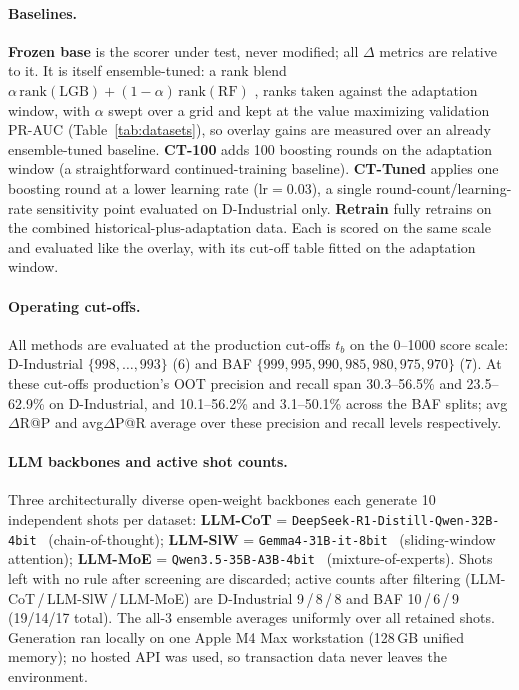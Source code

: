 \documentclass[11pt]{article}
\begin{document}
\paragraph{Baselines.}
\textbf{Frozen base} is the scorer under test, never modified; all $\Delta$ metrics are relative to
it. It is itself ensemble-tuned: a rank blend
$\alpha\,\mathrm{rank}(\mathrm{LGB})+(1{-}\alpha)\,\mathrm{rank}(\mathrm{RF})$
\citep{ke2017lightgbm}, ranks taken against the adaptation window, with $\alpha$ swept over a grid
and kept at the value maximizing validation PR-AUC (Table~\ref{tab:datasets}), so overlay gains are
measured over an already ensemble-tuned baseline. \textbf{CT-100} adds 100 boosting rounds on the
adaptation window (a straightforward continued-training baseline). \textbf{CT-Tuned} applies one
boosting round at a lower learning rate (lr$=$0.03), a single round-count/learning-rate sensitivity
point evaluated on D-Industrial only. \textbf{Retrain} fully retrains on the combined
historical-plus-adaptation data. Each is scored on the same scale and evaluated like the overlay,
with its cut-off table fitted on the adaptation window.

\paragraph{Operating cut-offs.}
All methods are evaluated at the production cut-offs $t_b$ on the 0--1000 score scale:
D-Industrial $\{998,\dots,993\}$ (6) and BAF $\{999,995,990,985,980,975,970\}$ (7). At these
cut-offs production's OOT precision and recall span 30.3--56.5\% and 23.5--62.9\% on D-Industrial,
and 10.1--56.2\% and 3.1--50.1\% across the BAF splits; avg$\Delta$R@P and avg$\Delta$P@R average
over these precision and recall levels respectively.

\paragraph{LLM backbones and active shot counts.}
Three architecturally diverse open-weight backbones each generate 10 independent shots per dataset:
\textbf{LLM-CoT} = \texttt{DeepSeek-R1-\allowbreak Distill-Qwen-\allowbreak 32B-4bit}~\citep{deepseek2025r1}
(chain-of-thought); \textbf{LLM-SlW} = \texttt{Gemma4-31B-it-8bit}~\citep{gemma2026gemma4}
(sliding-window attention); \textbf{LLM-MoE} = \texttt{Qwen3.5-35B-A3B-4bit}~\citep{qwen2026qwen35}
(mixture-of-experts). Shots left with no rule after screening are discarded; active counts after
filtering (LLM-CoT\,/\,LLM-SlW\,/\,LLM-MoE) are D-Industrial \mbox{9\,/\,8\,/\,8} and BAF
\mbox{10\,/\,6\,/\,9} (19/14/17 total). The all-3 ensemble averages uniformly over all retained
shots. Generation ran locally on one Apple M4 Max workstation (128\,GB unified memory); no hosted
API was used, so transaction data never leaves the environment.
\end{document}

